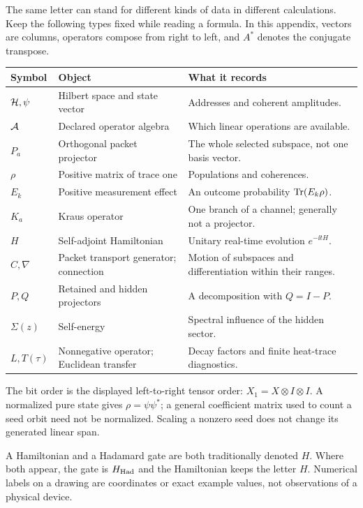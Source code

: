 The same letter can stand for different kinds of data in different calculations. Keep the following types fixed while reading a formula. In this appendix, vectors are columns, operators compose from right to left, and $A^*$ denotes the conjugate transpose.
\par\vspace{4pt}
\begin{tabularx}{\linewidth}{@{}p{.13\linewidth}YY@{}}
\toprule
Symbol & Object & What it records\\\midrule
$\HH,\psi$ & Hilbert space and state vector & Addresses and coherent amplitudes.\\
$\AA$ & Declared operator algebra & Which linear operations are available.\\
$P_a$ & Orthogonal packet projector & The whole selected subspace, not one basis vector.\\
$\rho$ & Positive matrix of trace one & Populations and coherences.\\
$E_k$ & Positive measurement effect & An outcome probability $\operatorname{Tr}(E_k\rho)$.\\
$K_a$ & Kraus operator & One branch of a channel; generally not a projector.\\
$H$ & Self-adjoint Hamiltonian & Unitary real-time evolution $e^{-\ii tH}$.\\
$C,\nabla$ & Packet transport generator; connection & Motion of subspaces and differentiation within their ranges.\\
$P,Q$ & Retained and hidden projectors & A decomposition with $Q=I-P$.\\
$\Sigma(z)$ & Self-energy & Spectral influence of the hidden sector.\\
$L,T(\tau)$ & Nonnegative operator; Euclidean transfer & Decay factors and finite heat-trace diagnostics.\\\bottomrule
\end{tabularx}
The bit order is the displayed left-to-right tensor order: $X_1=X\otimes I\otimes I$. A normalized pure state gives $\rho=\psi\psi^*$; a general coefficient matrix used to count a seed orbit need not be normalized. Scaling a nonzero seed does not change its generated linear span.

A Hamiltonian and a Hadamard gate are both traditionally denoted $H$. Where both appear, the gate is $H_{\rm Had}$ and the Hamiltonian keeps the letter $H$. Numerical labels on a drawing are coordinates or exact example values, not observations of a physical device.

